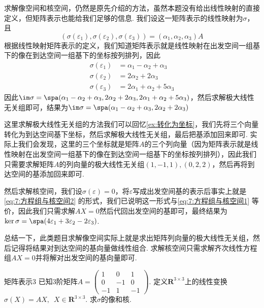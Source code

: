 \begin{solution}
    求解像空间和核空间，仍然是原先介绍的方法，虽然本题没有给出线性映射的直接定义，但矩阵表示也能给我们足够的信息. 我们设这一矩阵表示的线性映射为$\sigma$，且
    \[(\sigma(\varepsilon_1),\sigma(\varepsilon_2),\sigma(\varepsilon_3))=(\alpha_1,\alpha_2,\alpha_3)A\]
    根据线性映射矩阵表示的定义，我们知道矩阵表示就是线性映射在出发空间一组基下的像在到达空间一组基下的坐标按列排列，因此
    \begin{align*}
        \sigma(\varepsilon_1) & =\alpha_1-\alpha_2+\alpha_3   \\
        \sigma(\varepsilon_2) & =2\alpha_2+2\alpha_3          \\
        \sigma(\varepsilon_3) & =2\alpha_1+\alpha_2+5\alpha_3
    \end{align*}
    因此$\im\sigma=\spa(\alpha_1-\alpha_2+\alpha_3,2\alpha_2+2\alpha_3,2\alpha_1+\alpha_2+5\alpha_3)$，然后求解极大线性无关组即可，结果为$\im\sigma=\spa(\alpha_1-\alpha_2+\alpha_3,2\alpha_2+2\alpha_3)$

    这里求解极大线性无关组的方法我们可以回忆\autoref{ex:转化为坐标}，我们先将三个向量转化为到达空间基下坐标，然后求解极大线性无关组，最后把基添加回来即可. 实际上我们会发现，这里的三个坐标就是矩阵$A$的三个列向量（因为矩阵表示就是线性映射在出发空间一组基下的像在到达空间一组基下的坐标按列排列），因此我们只需要求解矩阵$A$的列向量的极大线性无关组$(1,-1,1),(0,2,2)$，然后再将到达空间的基添加回来即可.

    然后求解核空间，我们设$\sigma(\varepsilon)=0$，将$\varepsilon$写成出发空间基的表示后事实上就是\autoref{eq:7:方程组与核空间2} 的形式，我们已说明这一形式与\autoref{eq:7:方程组与核空间1} 等价，因此我们只需求解$AX=0$然后代回出发空间的基即可，最终结果为$\ker\sigma=\spa(4\varepsilon_1+3\varepsilon_2-2\varepsilon_3)$.
\end{solution}

总结一下，此类题目求解像空间实际上就是求出矩阵列向量的极大线性无关组，然后记得将结果对到达空间的基向量做线性组合. 求解核空间只需求解齐次线性方程组$AX=0$并将解对出发空间的基向量即可.

\begin{example}{}{矩阵表示3}
    已知3阶矩阵$A=\begin{pmatrix}
            1 & 0 & 1 \\ 0 & -1 & 0 \\ -1 & 1 & -1
        \end{pmatrix}$. 定义$\mathbf{R}^{3 \times 3}$上的线性变换$\sigma(X)=AX,\enspace X \in \mathbf{R}^{3 \times 3}$. 求$\sigma$的像和核.
\end{example}

